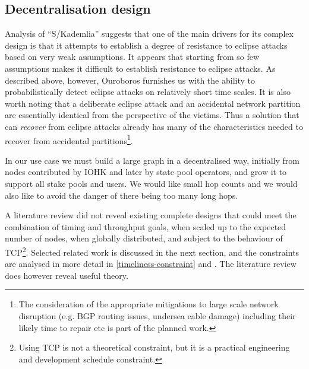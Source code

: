 \documentclass[11pt,a4paper]{article}
\begin{document}
\subsection{Decentralisation design}
\label{decentralisation-design}

Analysis of ``S/Kademlia'' suggests that one of the main drivers for its
complex design is that it attempts to establish a degree of resistance
to eclipse attacks based on very weak assumptions. It appears that
starting from so few assumptions makes it difficult to establish
resistance to eclipse attacks. As described above, however, Ouroboros
furnishes us with the ability to probabilistically detect eclipse
attacks on relatively short time scales. It is also worth noting that a
deliberate eclipse attack and an accidental network partition are
essentially identical from the perspective of the victims. Thus a
solution that can \emph{recover} from eclipse attacks already has many
of the characteristics needed to recover from accidental
partitions\footnote{The consideration of the appropriate mitigations to
  large scale network disruption (e.g. BGP routing issues, undersea
  cable damage) including their likely time to repair etc is part of the
  planned work.}.

In our use case we must build a large graph in a decentralised way,
initially from nodes contributed by IOHK and later by state pool
operators, and grow it to support all stake pools and users. We would
like small hop counts and we would also like to avoid the danger of
there being too many long hops.

A literature review did not reveal existing complete designs that could
meet the combination of timing and throughput goals, when scaled up to
the expected number of nodes, when globally distributed, and subject to
the behaviour of TCP\footnote{Using TCP is not a theoretical constraint,
  but it is a practical engineering and development schedule constraint.}.
Selected related work is discussed in the next section, and the
constraints are analysed in more detail in
\cref{timeliness-constraint} and
.
The literature review does however reveal useful theory.
\end{document}
